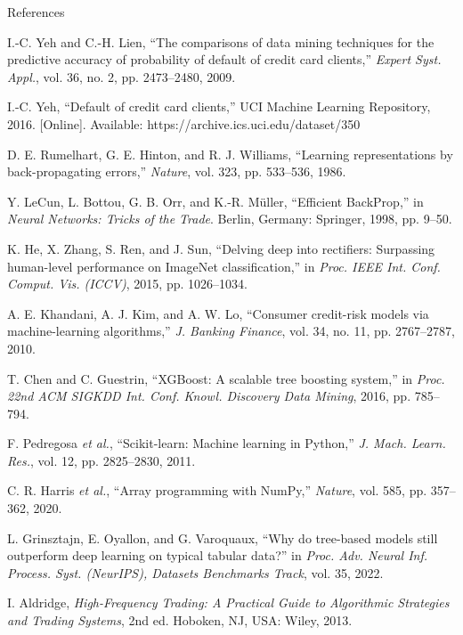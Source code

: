 \documentclass[aspectratio=169]{beamer}
\newcommand{\refitem}[2]{\par\noindent\hangindent=1.1cm\hangafter=1 \makebox[1.1cm][l]{[#1]}#2}
\begin{document}
\begin{frame}{References}
  \fontsize{6.8}{8.2}\selectfont
  \setlength{\parskip}{2pt}
  \refitem{1}{I.-C. Yeh and C.-H. Lien, ``The comparisons of data mining techniques for the predictive accuracy of probability of default of credit card clients,'' \textit{Expert Syst. Appl.}, vol. 36, no. 2, pp. 2473--2480, 2009.}
  \refitem{2}{I.-C. Yeh, ``Default of credit card clients,'' UCI Machine Learning Repository, 2016. [Online]. Available: https://archive.ics.uci.edu/dataset/350}
  \refitem{3}{D. E. Rumelhart, G. E. Hinton, and R. J. Williams, ``Learning representations by back-propagating errors,'' \textit{Nature}, vol. 323, pp. 533--536, 1986.}
  \refitem{4}{Y. LeCun, L. Bottou, G. B. Orr, and K.-R. M\"{u}ller, ``Efficient BackProp,'' in \textit{Neural Networks: Tricks of the Trade}. Berlin, Germany: Springer, 1998, pp. 9--50.}
  \refitem{5}{K. He, X. Zhang, S. Ren, and J. Sun, ``Delving deep into rectifiers: Surpassing human-level performance on ImageNet classification,'' in \textit{Proc. IEEE Int. Conf. Comput. Vis. (ICCV)}, 2015, pp. 1026--1034.}
  \refitem{6}{A. E. Khandani, A. J. Kim, and A. W. Lo, ``Consumer credit-risk models via machine-learning algorithms,'' \textit{J. Banking Finance}, vol. 34, no. 11, pp. 2767--2787, 2010.}
  \refitem{7}{T. Chen and C. Guestrin, ``XGBoost: A scalable tree boosting system,'' in \textit{Proc. 22nd ACM SIGKDD Int. Conf. Knowl. Discovery Data Mining}, 2016, pp. 785--794.}
  \refitem{8}{F. Pedregosa \textit{et al.}, ``Scikit-learn: Machine learning in Python,'' \textit{J. Mach. Learn. Res.}, vol. 12, pp. 2825--2830, 2011.}
  \refitem{9}{C. R. Harris \textit{et al.}, ``Array programming with NumPy,'' \textit{Nature}, vol. 585, pp. 357--362, 2020.}
  \refitem{10}{L. Grinsztajn, E. Oyallon, and G. Varoquaux, ``Why do tree-based models still outperform deep learning on typical tabular data?'' in \textit{Proc. Adv. Neural Inf. Process. Syst. (NeurIPS), Datasets Benchmarks Track}, vol. 35, 2022.}
  \refitem{11}{I. Aldridge, \textit{High-Frequency Trading: A Practical Guide to Algorithmic Strategies and Trading Systems}, 2nd ed. Hoboken, NJ, USA: Wiley, 2013.}
\end{frame}
\end{document}
